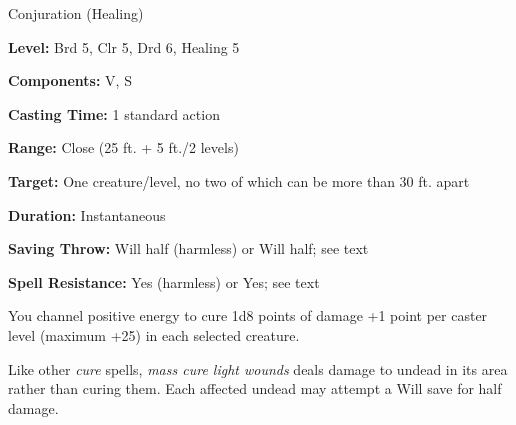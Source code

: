 \label{spell:Mass Cure Light Wounds}

Conjuration (Healing)

\textbf{Level:} Brd 5, Clr 5, Drd 6, Healing 5

\textbf{Components:} V, S

\textbf{Casting Time:} 1 standard action

\textbf{Range:} Close (25 ft. + 5 ft./2 levels)

\textbf{Target:} One creature/level, no two of which can be more than 30 ft. apart

\textbf{Duration:} Instantaneous

\textbf{Saving Throw:} Will half (harmless) or Will half; see text

\textbf{Spell Resistance:} Yes (harmless) or Yes; see text

You channel positive energy to cure 1d8 points of damage +1 point per caster level 
(maximum +25) in each selected creature.

Like other \textit{cure} spells, \textit{mass cure light wounds} deals damage to 
undead in its area rather than curing them. Each affected undead may attempt a 
Will save for half damage.

